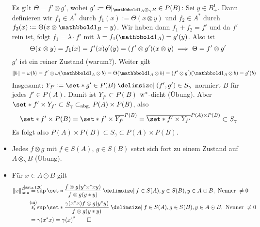 \begin{beweis}
\begin{itemize}
        Es gilt $\Theta = f' \otimes g'$, wobei $g' \coloneqq \Theta|_{\ind_A \otimes_\gamma B} \in P(B)$:
        Sei $y \in B_+^1$.
        Dann definieren wir $f_1 \in A^*$ durch $f_1(x) := \Theta(x \otimes y)$ und $f_2 \in  A^*$ durch $f_2(x) \coloneqq \Theta(x \otimes \ind_B -y)$.
        Wir haben dann $f_1 + f_2 =f'$ und da $f'$ rein ist, folgt $f_1 = \lambda \cdot f'$ mit $\lambda = f_1(\ind_A) =g'(y)$.
        Also ist
        \[
            \Theta(x \otimes y) =f_1(x) = f'(x) g'(y) = \enbrace*{f' \otimes g'}(x \otimes y) \implies \Theta = f' \otimes g'
        \]
        $g'$ ist ein reiner Zustand (warum?).
        Weiter gilt 
        \[
            \norm*{b} =\omega(b) =f' \otimes \omega(\ind_A \otimes b) = \Theta(\ind _A \otimes b) = (f' \otimes g')(\ind_A \otimes b) = g'(b)
        \]
        Insgesamt: $Y_{f'} \coloneqq \set*{g' \in P(B) \given (f',g') \in S_\gamma}$ normiert $B$ für jedes $f' \in P(A)$.
        Damit ist $Y_{f'} \subset P(B)$ $\mkern1mu\mathrm{w}^*$-dicht (Übung).
        Aber $\set*{f'} \times Y_{f'} \subset S_\gamma \subset_{\mathrm{abg.}} P(A) \times P(B)$, also 
        \[
            \set*{f'} \times P(B) = \set*{f'} \times \overline{Y_{f'}}^{P(B)} = \overline{\set*{f'} \times Y_{f'}}^{P(A) \times P(B)} \subset S_\gamma
        \]
        Es folgt also $P(A) \times P(B) \subset S_\gamma \subset P(A) \times P(B)$.
        \item Jedes $f \otimes g$ mit $f \in S(A)$, $g \in S(B)$ setzt sich fort zu einem Zustand auf $A \otimes_\gamma B$ (Übung).
        \item Für $x \in A \odot B$ gilt
        \begin{align}
            \norm*{x}_{\min}^2 &\StackTextClap{\ref{satz:120}}{=} \sup \set*{ \frac{f \otimes g(y^* x^* xy)}{f \otimes g(y* y)} \given f \in S(A), g \in S(B), y \in A \odot B, \text{ Nenner } \neq 0} \\
            &\StackTextClap{(iii)}{\le} \sup \set*{ \frac{\gamma(x^* x) f \otimes g(y^*y)}{f \otimes g(y* y)} \given f \in S(A), g \in S(B), y \in A \odot B, \text{ Nenner } \neq 0}\\
            &= \gamma(x^*x) = \gamma(x)^2 \qedhere
        \end{align}
    \end{itemize}
\end{beweis}

